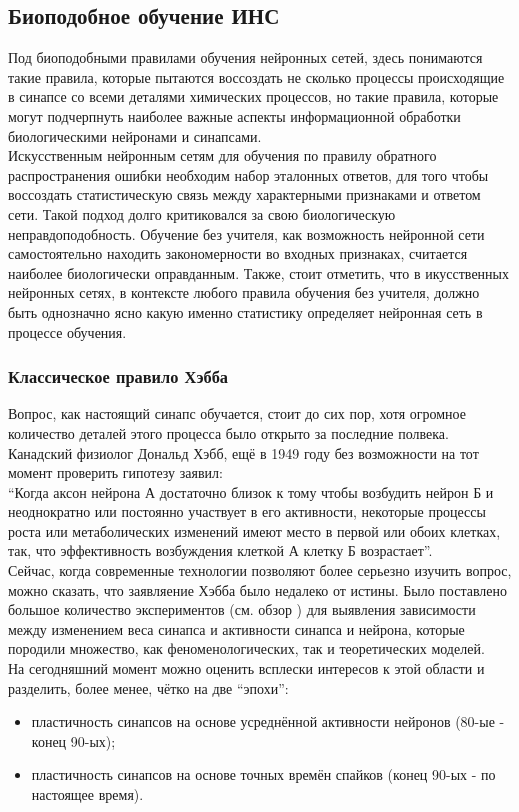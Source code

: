 \documentclass[a4paper,10pt]{article}
\begin{document}
\subsection{Биоподобное обучение ИНС}
\indent Под биоподобными правилами обучения нейронных сетей, здесь понимаются такие правила, которые пытаются воссоздать не сколько процессы происходящие в синапсе со всеми деталями химических процессов, но такие правила, которые могут подчерпнуть наиболее важные аспекты информационной обработки биологическими нейронами и синапсами.\\
\indent Искусственным нейронным сетям для обучения по правилу обратного распространения ошибки необходим набор эталонных ответов, для того чтобы воссоздать статистическую связь между характерными признаками и ответом сети. Такой подход долго критиковался за свою биологическую неправдоподобность\cite{Uossermen}. Обучение без учителя, как возможность нейронной сети самостоятельно находить закономерности во входных признаках, считается наиболее биологически оправданным. Также, стоит отметить, что в икусственных нейронных сетях, в контексте любого правила обучения без учителя, должно быть однозначно ясно какую именно статистику определяет нейронная сеть в процессе обучения.\\

\subsubsection{Классическое правило Хэбба}\label{sec:hebb}
\indent Вопрос, как настоящий синапс обучается, стоит до сих пор, хотя огромное количество деталей этого процесса было открыто за последние полвека. Канадский физиолог Дональд Хэбб, ещё в 1949 году без возможности на тот момент проверить гипотезу заявил:\\
\indent ``Когда аксон нейрона А достаточно близок к тому чтобы возбудить нейрон Б и неоднократно или постоянно участвует в его активности, некоторые процессы роста или метаболических изменений имеют место в первой или обоих клетках, так, что эффективность возбуждения клеткой А клетку Б возрастает''\cite{Hebb1949}.\\
\indent Сейчас, когда современные технологии позволяют более серьезно изучить вопрос, можно сказать, что заявляение Хэбба было недалеко от истины. Было поставлено большое количество экспериментов (см. обзор \cite{BiPoo}) для выявления зависимости между изменением веса синапса и активности синапса и нейрона, которые породили множество, как феноменологических, так и теоретических моделей.\\
\indent На сегодняшний момент можно оценить всплески интересов к этой области и разделить, более менее, чётко на две ``эпохи'':
\begin{itemize}
\item пластичность синапсов на основе усреднённой активности нейронов (80-ые - конец 90-ых);
\item пластичность синапсов на основе точных времён спайков (конец 90-ых - по настоящее время).
\end{itemize}
\end{document}
